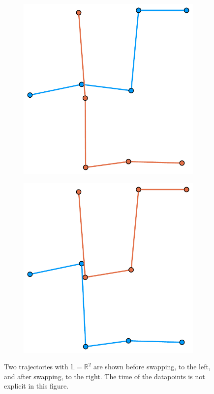 \documentclass[12pt]{article}
\newcommand{\R}{\mathbb{R}}
\newcommand{\locset}{\mathbb{L}}
\theoremstyle{definition}
\begin{document}
\begin{figure}
  \centering
  \begin{subfigure}[t]{0.4\textwidth}
    \includegraphics[width=\textwidth]{swapping_spatial-a.pdf}
    \caption{}
  \end{subfigure}
  \begin{subfigure}[t]{0.4\textwidth}
    \includegraphics[width=\textwidth]{swapping_spatial-b.pdf}
    \caption{}
  \end{subfigure}
  \caption{Two trajectories with \(\locset = \R^{2}\) are shown before
    swapping, to the left, and after swapping, to the right. The time
    of the datapoints is not explicit in this figure.}
  \label{fig:swapping-spatial}
\end{figure}
\end{document}
